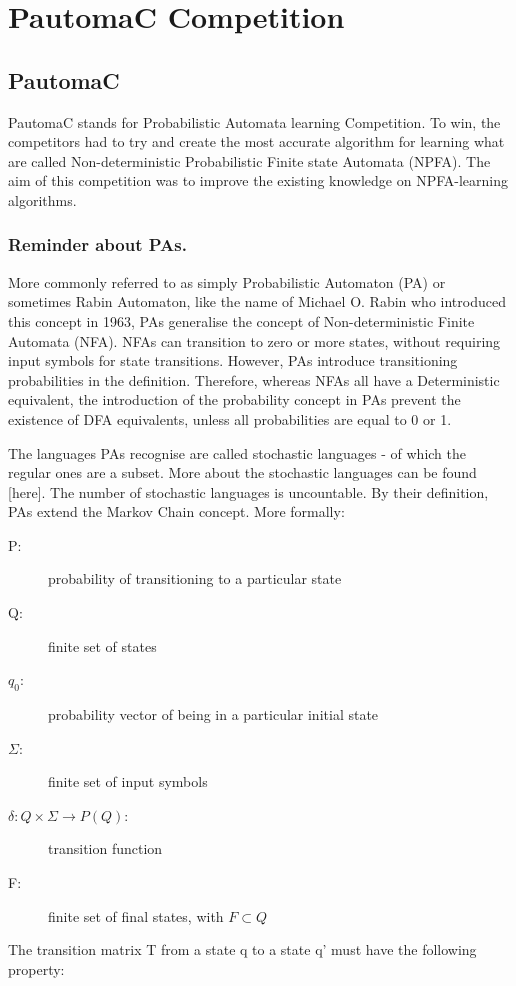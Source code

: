 \section{PautomaC Competition}

\subsection{PautomaC}
PautomaC stands for Probabilistic Automata learning
Competition. To win, the competitors had to try and create the most
accurate algorithm for learning what are called Non-deterministic
Probabilistic Finite state Automata (NPFA). The aim of this competition
was to improve the existing knowledge on NPFA-learning algorithms.


\subsubsection{Reminder about PAs.}

\quad{}\enskip{}More commonly referred to as simply Probabilistic
Automaton (PA) or sometimes Rabin Automaton, like the name of Michael
O. Rabin who introduced this concept in 1963, PAs generalise the concept
of Non-deterministic Finite Automata (NFA). NFAs can transition to
zero or more states, without requiring input symbols for state transitions.
However, PAs introduce transitioning probabilities in the definition.
Therefore, whereas NFAs all have a Deterministic equivalent, the introduction
of the probability concept in PAs prevent the existence of DFA equivalents,
unless all probabilities are equal to 0 or 1.

The languages PAs recognise are called stochastic languages - of which
the regular ones are a subset. More about the stochastic languages
can be found {[}here{]}. The number of stochastic languages is uncountable.
By their definition, PAs extend the Markov Chain concept. More formally:
\begin{description}
\item [{P:}] probability of transitioning to a particular state
\item [{Q:}] finite set of states
\item [{$q_{0}$:}] probability vector of being in a particular initial
state
\item [{$\varSigma$:}] finite set of input symbols
\item [{$\delta:Q\times\varSigma\longrightarrow P(Q)$:}] transition function
\item [{F:}] finite set of final states, with $F\subset Q$
\end{description}
The transition matrix T from a state q to a state q' must have the
following property:

